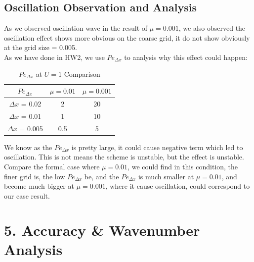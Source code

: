 \documentclass[12pt]{article}
\begin{document}
 \subsection{Oscillation Observation and Analysis}

 As we observed oscillation wave in the result of $\mu =0.001$,
 we also observed the oscillation effect shows more obvious
 on the coarse grid, it do not show obviously at the grid 
 size = 0.005.\\

 As we have done in HW2, we use $Pe_{\Delta x }$ to analysis
 why this effect could happen:\\

 \begin{table}[h!]
    \centering
    \renewcommand{\arraystretch}{1.5} %
    \begin{tabular}{c|c c}
        $Pe_{\Delta x}$ & $\mu = 0.01$ & $\mu = 0.001$ \\
        \hline
        ${\Delta x}$ = 0.02 & 2 & 20 \\
        ${\Delta x}$ = 0.01 & 1 & 10 \\
        ${\Delta x}$ = 0.005 & 0.5 & 5 \\
    \end{tabular}
    \caption{$Pe_{\Delta x}$ at $U=1$ Comparison}
\end{table}


We know as the $Pe_{\Delta x}$ is pretty large, it could
cause negative term which led to oscillation. This is not
means the scheme is unstable, but the effect is unstable.\\

Compare the formal case where $\mu = 0.01$, we could find 
in this condition, the finer grid is, the low $Pe_{\Delta x}$
be, and the $Pe_{\Delta x}$ is much smaller at $\mu = 0.01$, and
become much bigger at $\mu = 0.001$, where it cause oscillation,
 could correspond to 
our case result.








\section{5. Accuracy \& Wavenumber Analysis}
\end{document}
